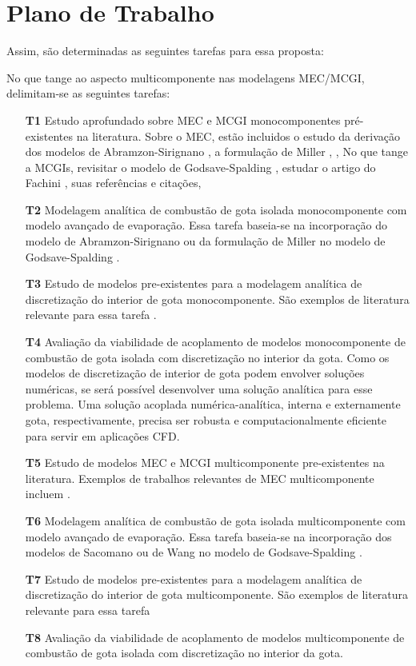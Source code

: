 \section{Plano de Trabalho}

Assim, são determinadas as seguintes tarefas para essa proposta:

No que tange ao aspecto multicomponente nas modelagens MEC/MCGI, delimitam-se as seguintes tarefas:

\begin{itemize}
    \item[\textbf{T1 }] Estudo aprofundado sobre MEC e MCGI monocomponentes pré-existentes na literatura. Sobre o MEC, estão incluidos o estudo da derivação dos modelos de Abramzon-Sirignano \cite{Sirignano1989}, a formulação de Miller \cite{MillerR1998}, , No que tange a MCGIs, revisitar o modelo de Godsave-Spalding \cite{Law1978,HenningsJ2024MT}, estudar o artigo do Fachini \cite{FachiniF1999}, suas referências e citações,  
    \item[\textbf{T2 }] Modelagem analítica de combustão de gota isolada monocomponente com modelo avançado de evaporação. Essa tarefa baseia-se na incorporação do modelo de Abramzon-Sirignano \cite{Sirignano1989} ou da formulação de Miller \cite{MillerR1998} no modelo de Godsave-Spalding \cite{Law1978}. %
    \item[\textbf{T3 }] Estudo de modelos pre-existentes para a modelagem  analítica de discretização do interior de gota monocomponente. São exemplos de literatura relevante para essa tarefa \source{}.
    \item[\textbf{T4 }] Avaliação da viabilidade de acoplamento de modelos monocomponente de combustão de gota isolada com discretização no interior da gota. Como os modelos de discretização de interior de gota podem envolver soluções numéricas, se será possível desenvolver uma solução analítica para esse problema. Uma solução acoplada numérica-analítica, interna e externamente gota, respectivamente, precisa ser robusta e computacionalmente eficiente para servir em aplicações CFD. 

    
    \item[\textbf{T5 }] Estudo de modelos MEC e MCGI multicomponente pre-existentes na literatura. Exemplos de trabalhos relevantes de MEC multicomponente incluem \source{}.
    \item[\textbf{T6 }]  Modelagem analítica de combustão de gota isolada multicomponente com modelo avançado de evaporação. Essa tarefa baseia-se na incorporação dos modelos de Sacomano \cite{SacomanoF2022IJHMT} ou de Wang  no modelo de Godsave-Spalding \cite{Law1978}.
    \item[\textbf{T7 }] Estudo de modelos pre-existentes para a modelagem  analítica de discretização do interior de gota multicomponente. São exemplos de literatura relevante para essa tarefa \source{}
    \item[\textbf{T8 }] Avaliação da viabilidade de acoplamento de modelos multicomponente de combustão de gota isolada com discretização no interior da gota. 
    

\end{itemize}
